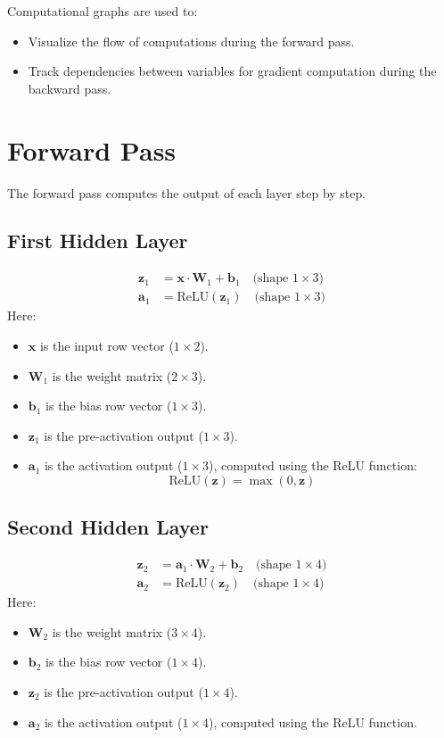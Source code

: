 \begin{notechapter}
Computational graphs are used to:
\begin{itemize}[leftmargin=*]
    \item Visualize the flow of computations during the forward pass.
    \item Track dependencies between variables for gradient computation
    during the backward pass.
\end{itemize}

\section{Forward Pass}
The forward pass computes the output of each layer step by step.

\subsection{First Hidden Layer}
\begin{align*}
    \bm{z}_1 &= \bm{x} \cdot \bm{W}_1 + \bm{b}_1 \quad
    \text{(shape } 1 \times 3\text{)} \\
    \bm{a}_1 &= \text{ReLU}(\bm{z}_1) \quad
    \text{(shape } 1 \times 3\text{)}
\end{align*}
Here:
\begin{itemize}[leftmargin=*]
    \item \(\bm{x}\) is the input row vector (\(1 \times 2\)).
    \item \(\bm{W}_1\) is the weight matrix (\(2 \times 3\)).
    \item \(\bm{b}_1\) is the bias row vector (\(1 \times 3\)).
    \item \(\bm{z}_1\) is the pre-activation output (\(1 \times 3\)).
    \item \(\bm{a}_1\) is the activation output (\(1 \times 3\)),
    computed using the ReLU function:
    \[
    \text{ReLU}(\bm{z}) = \max(0, \bm{z})
    \]
\end{itemize}

\subsection{Second Hidden Layer}
\begin{align*}
    \bm{z}_2 &= \bm{a}_1 \cdot \bm{W}_2 + \bm{b}_2 \quad
    \text{(shape } 1 \times 4\text{)} \\
    \bm{a}_2 &= \text{ReLU}(\bm{z}_2) \quad
    \text{(shape } 1 \times 4\text{)}
\end{align*}
Here:
\begin{itemize}[leftmargin=*]
    \item \(\bm{W}_2\) is the weight matrix (\(3 \times 4\)).
    \item \(\bm{b}_2\) is the bias row vector (\(1 \times 4\)).
    \item \(\bm{z}_2\) is the pre-activation output (\(1 \times 4\)).
    \item \(\bm{a}_2\) is the activation output (\(1 \times 4\)),
    computed using the ReLU function.
\end{itemize}


\end{notechapter}

